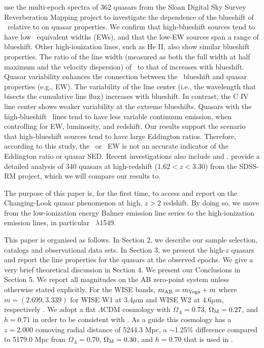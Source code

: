 \documentclass[a4paper,fleqn,usenatbib]{mnras}
\begin{document}
\citet{Sun2018} use the multi-epoch spectra of 362 quasars from the
Sloan Digital Sky Survey Reverberation Mapping project to investigate
the dependence of the blueshift of \civ\ relative to \mgii on quasar
properties. We confirm that high-blueshift sources tend to have low
\civ\ equivalent widths (EWs), and that the low-EW sources span a range
of blueshift. Other high-ionization lines, such as He II, also show
similar blueshift properties. The ratio of the line width (measured as
both the full width at half maximum and the velocity dispersion) of
\civ\ to that of \mgii increases with blueshift. Quasar variability
enhances the connection between the \civ\ blueshift and quasar
properties (e.g., EW). The variability of the \mgii line center (i.e.,
the wavelength that bisects the cumulative line flux) increases with
blueshift. In contrast, the C IV line center shows weaker variability
at the extreme blueshifts. Quasars with the high-blueshift \civ\ lines
tend to have less variable continuum emission, when controlling for
EW, luminosity, and redshift. Our results support the scenario that
high-blueshift sources tend to have large Eddington ratios.
Therefore, according to this study, the \civ\ or \heii\ EW is not an
accurate indicator of the Eddington ratio or quasar SED.
Recent investigations also include \citet{Meyer2019} and \citet{Doan2019}. 
\citet{Dyer2019} provide a detailed analysis of 340 quasars at high-redshift
($1.62<z<3.30$) from the SDSS-RM project, which we will compare our
results to.

The purpose of this paper is, for the first time, to access and 
report on the Changing-Look quasar phenomenon at high, 
$z>2$ redshift. By doing so, we move from the low-ionization 
energy Balmer emission line series to the high-ionization emission 
lines, in particular \civ\ $\lambda$1549. 

This paper is organised as follows. In Section 2, we describe our
sample selection, catalogs and observational data sets.  In Section 3,
we present the high-$z$ quasars and report the line properties for the
quasars at the observed epochs.  We give a very brief theoretical
discussion in Section 4. We present our Conclusions in Section 5.  We
report all magnitudes on the AB zero-point system \citep{Oke_Gunn1983,
Fukugita1996} unless otherwise stated explicitly. For the WISE bands,
$m_{\rm AB} = m_{\rm Vega} + m$ where $m = (2.699, 3.339)$ for WISE W1
at 3.4$\mu$m and WISE W2 at 4.6$\mu$m, respectively
\citep{Cutri2011}.
We adopt a flat $\Lambda$CDM cosmology with $\Omega_{\Lambda} = 0.73$,
$\Omega_{\rm M} = 0.27$, and $h = 0.71$ in order to be consistent with
\citet{Hamann2017}. As a guide this cosmology has a $z=2.000$
comoving radial distance of 5244.3 Mpc, a $\sim$1.25\% difference
compared to 5179.0 Mpc from $\Omega_{\Lambda} = 0.70$, $\Omega_{\rm M}
= 0.30$, and $h = 0.70$ that is used in \citet{Shen2011}.
\end{document}
